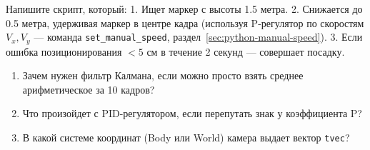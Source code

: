 \begin{taskbox}
Напишите скрипт, который:
1. Ищет маркер с высоты 1.5 метра.
2. Снижается до 0.5 метра, удерживая маркер в центре кадра (используя P-регулятор по скоростям $V_x, V_y$ --- команда \verb|set_manual_speed|, раздел~\ref{sec:python-manual-speed}).
3. Если ошибка позиционирования $< 5$ см в течение 2 секунд — совершает посадку.
\end{taskbox}

\begin{questionbox}
\begin{enumerate}
    \item Зачем нужен фильтр Калмана, если можно просто взять среднее арифметическое за 10 кадров?
    \item Что произойдет с PID-регулятором, если перепутать знак у коэффициента P?
    \item В какой системе координат (Body или World) камера выдает вектор \texttt{tvec}?
\end{enumerate}
\end{questionbox}
